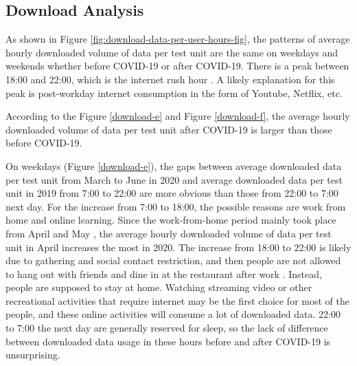 
\subsection{Download Analysis}
\label{sec:download-analysis}

As shown in Figure \ref{fig:download-data-per-user-hours-fig}, the patterns of average hourly downloaded volume of data per test unit are the same on weekdays and weekends whether before COVID-19 or after COVID-19. There is a peak between 18:00 and 22:00, which is the internet rush hour \cite{internetrushhour}. A likely explanation for this peak is post-workday internet consumption in the form of Youtube, Netflix, etc.

According to the Figure \ref{download-e} and Figure \ref{download-f}, the average hourly downloaded volume of data per test unit after COVID-19 is larger than those before COVID-19.

On weekdays (Figure \ref{download-e}), the gaps between average downloaded data per test unit from March to June in 2020 and average downloaded data per test unit in 2019 from 7:00 to 22:00 are more obvious than those from 22:00 to 7:00 next day. For the increase from 7:00 to 18:00, the possible reasons are work from home and online learning. Since the work-from-home period mainly took place from April and May \cite{remotework}, the average hourly downloaded volume of data per test unit in April increases the most in 2020. The increase from 18:00 to 22:00 is likely due to gathering and social contact restriction, and then people are not allowed to hang out with friends and dine in at the restaurant after work \cite{lockdownsguide}. Instead, people are supposed to stay at home. Watching streaming video or other recreational activities that require internet may be the first choice for most of the people, and these online activities will consume a lot of downloaded data. 22:00 to 7:00 the next day are generally reserved for sleep, so the lack of difference between downloaded data usage in these hours before and after COVID-19 is unsurprising.

